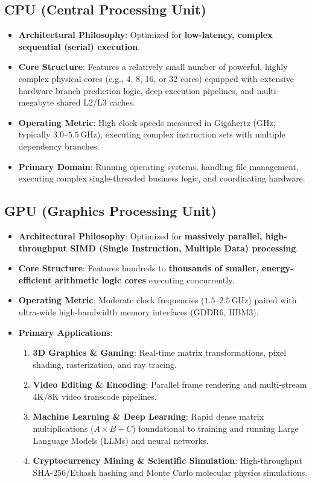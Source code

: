 \subsection{CPU (Central Processing Unit)}
\begin{itemize}
    \item \textbf{Architectural Philosophy}: Optimized for \textbf{low-latency, complex sequential (serial) execution}.
    \item \textbf{Core Structure}: Features a relatively small number of powerful, highly complex physical cores (e.g., 4, 8, 16, or 32 cores) equipped with extensive hardware branch prediction logic, deep execution pipelines, and multi-megabyte shared L2/L3 caches.
    \item \textbf{Operating Metric}: High clock speeds measured in Gigahertz ($\text{GHz}$, typically $3.0\text{--}5.5\,\text{GHz}$), executing complex instruction sets with multiple dependency branches.
    \item \textbf{Primary Domain}: Running operating systems, handling file management, executing complex single-threaded business logic, and coordinating hardware.
\end{itemize}

\subsection{GPU (Graphics Processing Unit)}
\begin{itemize}
    \item \textbf{Architectural Philosophy}: Optimized for \textbf{massively parallel, high-throughput SIMD (Single Instruction, Multiple Data) processing}.
    \item \textbf{Core Structure}: Features hundreds to \textbf{thousands of smaller, energy-efficient arithmetic logic cores} executing concurrently.
    \item \textbf{Operating Metric}: Moderate clock frequencies ($1.5\text{--}2.5\,\text{GHz}$) paired with ultra-wide high-bandwidth memory interfaces (GDDR6, HBM3).
    \item \textbf{Primary Applications}:
    \begin{enumerate}
        \item \textbf{3D Graphics \& Gaming}: Real-time matrix transformations, pixel shading, rasterization, and ray tracing.
        \item \textbf{Video Editing \& Encoding}: Parallel frame rendering and multi-stream 4K/8K video transcode pipelines.
        \item \textbf{Machine Learning \& Deep Learning}: Rapid dense matrix multiplications ($A \times B + C$) foundational to training and running Large Language Models (LLMs) and neural networks.
        \item \textbf{Cryptocurrency Mining \& Scientific Simulation}: High-throughput SHA-256/Ethash hashing and Monte Carlo molecular physics simulations.
    \end{enumerate}
\end{itemize}

